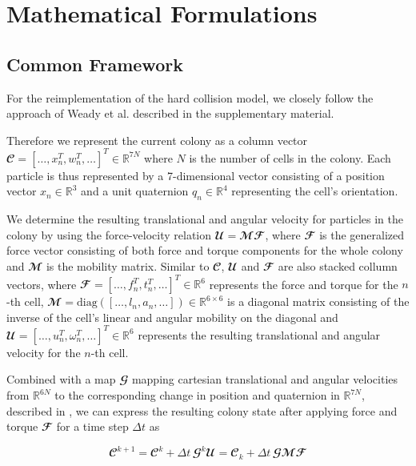 \documentclass[conference]{IEEEtran}
\begin{document}
\newpage

\section{Mathematical Formulations}

\subsection{Common Framework}


For the reimplementation of the hard collision model, we closely follow the approach of Weady et al. \cite{Weady2024} described in the supplementary material.

Therefore we represent the current colony as a column vector $\mathbfcal{C} = [\dots, x_n^T, w_n^T, \dots]^T \in \mathbb{R}^{7N}$ where $N$ is the number of cells in the colony. Each particle is thus represented by a 7-dimensional vector consisting of a position vector $x_n \in \mathbb{R}^3$ and a unit quaternion $q_n \in \mathbb{R}^4$ representing the cell's orientation.

We determine the resulting translational and angular velocity for particles in the colony by using the force-velocity relation $\mathbfcal{U} = \mathbfcal{M} \mathbfcal{F}$, where $\mathbfcal{F}$ is the generalized force vector consisting of both force and torque components for the whole colony and $\mathbfcal{M}$ is the mobility matrix. Similar to $\mathbfcal{C}$, $\mathbfcal{U}$ and $\mathbfcal{F}$ are also stacked collumn vectors, where $\mathbfcal{F} = [\dots, f_n^T, t_n^T, \dots]^T \in \mathbb{R}^{6}$ represents the force and torque for the $n$-th cell, $\mathbfcal{M} = \text{diag}([\dots, l_n, a_n, \dots]) \in \mathbb{R}^{6 \times 6}$ is a diagonal matrix consisting of the inverse of the cell's linear and angular mobility on the diagonal and $\mathbfcal{U} = [\dots, u_n^T, \omega_n^T, \dots]^T \in \mathbb{R}^{6}$ represents the resulting translational and angular velocity for the $n$-th cell.

Combined with a map $\mathbfcal{G}$ mapping cartesian translational and angular velocities from $\mathbb{R}^{6N}$ to the corresponding change in position and quaternion in $\mathbb{R}^{7N}$, described in \cite{Weady2024}, we can express the resulting colony state after applying force and torque $\mathbfcal{F}$ for a time step $\Delta t$ as

$$
    \mathbfcal{C}^{k+1}  = \mathbfcal{C}^k + \Delta t \, \mathbfcal{G}^k\mathbfcal{U} = \mathbfcal{C}_k + \Delta t \, \mathbfcal{G}\mathbfcal{M} \mathbfcal{F}
$$
\label{eq:colony_update}
\end{document}
